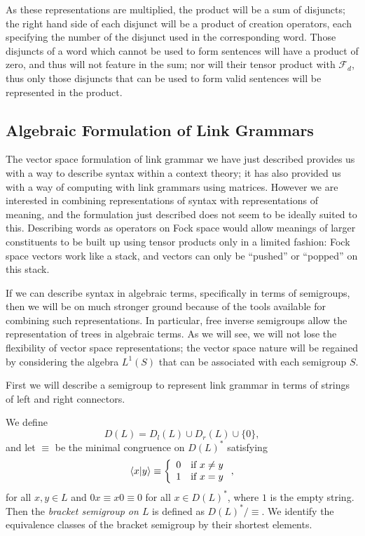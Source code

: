 As these representations are multiplied, the product will be a sum of disjuncts; the right hand side of each disjunct will be a product of creation operators, each specifying the number of the disjunct used in the corresponding word. Those disjuncts of a word which cannot be used to form sentences will have a product of zero, and thus will not feature in the sum; nor will their tensor product with $\mathcal{F}_d$, thus only those disjuncts that can be used to form valid sentences will be represented in the product.


\subsection{Algebraic Formulation of Link Grammars}
\label{alg-lg-section}
\label{link}

The vector space formulation of link grammar we have just described provides us with a way to describe syntax within a context theory; it has also provided us with a way of computing with link grammars using matrices. However we are interested in combining representations of syntax with representations of meaning, and the formulation just described does not seem to be ideally suited to this. Describing words as operators on Fock space would allow meanings of larger constituents to be built up using tensor products only in a limited fashion: Fock space vectors work like a stack, and vectors can only be ``pushed'' or ``popped'' on this stack.

If we can describe syntax in algebraic terms, specifically in terms of semigroups, then we will be on much stronger ground because of the tools available for combining such representations. In particular, free inverse semigroups allow the representation of trees in algebraic terms. As we will see, we will not lose the flexibility of vector space representations; the vector space nature will be regained by considering the algebra $L^1(S)$ that can be associated with each semigroup $S$.

First we will describe a semigroup to represent link grammar in terms of strings of left and right connectors.
\begin{defn}
We define
$$D(L) = D_l(L) \cup D_r(L) \cup \{0\},$$
and let $\equiv$ be the minimal congruence on $D(L)^*$ satisfying
$$\langle x| y\rangle \equiv \left\{ \begin{array}{ll}
	0 & \text{if }x \neq y \\
	1 & \text{if }x = y
\end{array}\right.,$$
for all $x,y \in L$ and $0x \equiv x0 \equiv 0$ for all $x \in D(L)^*$, where $1$ is the empty string. Then the \emph{bracket semigroup on $L$} is defined as $D(L)^*/ \equiv$. We identify the equivalence classes of the bracket semigroup by their shortest elements.
\end{defn}


